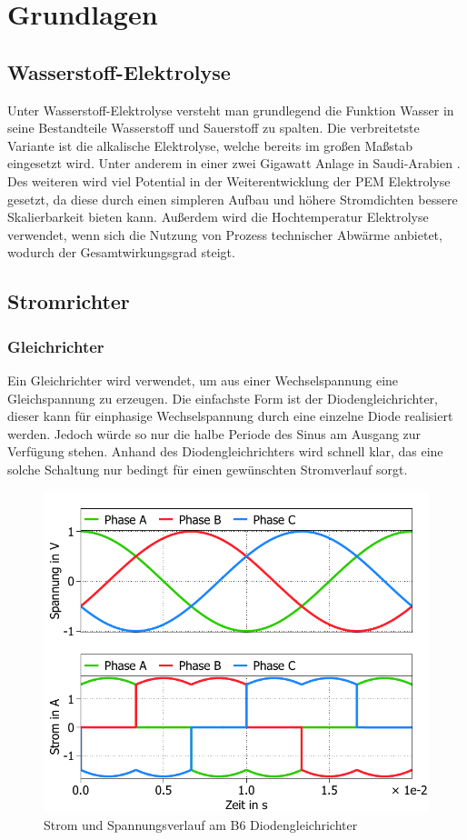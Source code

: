 \chapter{Grundlagen}


\section{Wasserstoff-Elektrolyse}
Unter Wasserstoff-Elektrolyse versteht man grundlegend die Funktion Wasser in seine Bestandteile Wasserstoff und Sauerstoff zu spalten. Die verbreitetste Variante ist die alkalische Elektrolyse, welche bereits im großen Maßstab eingesetzt wird. Unter anderem in einer zwei Gigawatt Anlage in Saudi-Arabien \cite{2GWely} . Des weiteren wird viel Potential in der Weiterentwicklung der PEM Elektrolyse gesetzt, da diese durch einen simpleren Aufbau und höhere Stromdichten bessere Skalierbarkeit bieten kann. Außerdem wird die Hochtemperatur Elektrolyse verwendet, wenn sich die Nutzung von Prozess technischer Abwärme anbietet, wodurch der Gesamtwirkungsgrad steigt.  

\section{Stromrichter}
\subsection{Gleichrichter}
Ein Gleichrichter wird verwendet, um aus einer Wechselspannung eine Gleichspannung zu erzeugen. Die einfachste Form ist der Diodengleichrichter, dieser kann für einphasige Wechselspannung durch eine einzelne Diode realisiert werden. Jedoch würde so nur die halbe Periode des Sinus am Ausgang zur Verfügung stehen. 
Anhand des Diodengleichrichters wird schnell klar, das eine solche Schaltung nur bedingt für einen gewünschten Stromverlauf sorgt.
\begin{figure}
	\centering
	\includegraphics[width=0.7\linewidth]{content/Grafiken/B6-Diodengleichrichter-Eingangsverlauf}
	\caption[B6DiodRect]{Strom und Spannungsverlauf am B6 Diodengleichrichter}
	\label{fig:b6-diodengleichrichter-eingangsverlauf}
\end{figure}


